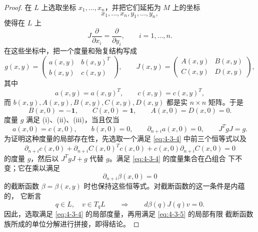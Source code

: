 \begin{proof}
在 $L$ 上选取坐标 $x_1,\ldots,x_n$，并把它们延拓为 $M$ 上的坐标
\[
  x_1,\ldots,x_n,y_1,\ldots,y_n,
\]
使得在 $L$ 上
\[
  J\frac{\partial}{\partial x_i}
  =\frac{\partial}{\partial y_i},
  \qquad
  i=1,\ldots,n.
\]
在这些坐标中，把一个度量和殆复结构写成
\[
  g(x,y)
  =
  \begin{pmatrix}
    a(x,y) & b(x,y)^T\\
    b(x,y) & c(x,y)
  \end{pmatrix},
  \qquad
  J(x,y)
  =
  \begin{pmatrix}
    A(x,y) & B(x,y)\\
    C(x,y) & D(x,y)
  \end{pmatrix},
\]
其中
\[
  a(x,y)=a(x,y)^T,
  \qquad
  c(x,y)=c(x,y)^T,
\]
而 $b(x,y),A(x,y),B(x,y),C(x,y),D(x,y)$ 都是实 $n\times n$ 矩阵。于是
\[
  B(x,0)=-\boldsymbol 1,
  \qquad
  C(x,0)=\boldsymbol 1,
  \qquad
  A(x,0)=D(x,0)=0.
\]
度量 $g$ 满足 \textup{(i)}、\textup{(ii)}、\textup{(iii)}，当且仅当
\begin{equation}\label{eq:4-3-4}
  a(x,0)=c(x,0),
  \qquad
  b(x,0)=0,
  \qquad
  \partial_{n+i}a(x,0)=0,
  \qquad
  J^TgJ=g.
\end{equation}
为证明这种度量的局部存在性，先选取一个满足 \eqref{eq:4-3-4} 中前三个恒等式以及
\[
  \partial_{n+i}c(x,0)
  +\partial_{n+i}C(x,0)^Tc(x,0)
  +c(x,0)\partial_{n+i}C(x,0)
  =0
\]
的度量 $g$，然后以 $J^TgJ+g$ 代替 $g$。满足 \eqref{eq:4-3-4} 的度量集合在凸组合
下不变；它在乘以满足
\[
  \partial_{n+i}\beta(x,0)=0
\]
的截断函数 $\beta=\beta(x,y)$ 时也保持这些恒等式。对截断函数的这一条件是内蕴的，
它断言
\begin{equation}\label{eq:4-3-5}
  q\in L,\quad v\in T_qL
  \qquad\Longrightarrow\qquad
  d\beta(q)J(q)v=0.
\end{equation}
因此，选取满足 \eqref{eq:4-3-4} 的局部度量，再用满足 \eqref{eq:4-3-5} 的局部有限
截断函数族所成的单位分解进行拼接，即得结论。
\end{proof}

